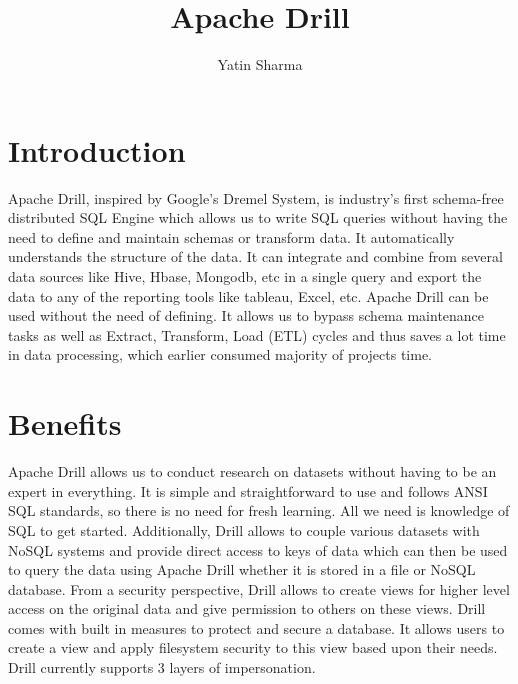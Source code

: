 \documentclass[9pt,twocolumn,twoside]{../../styles/osajnl}
\title{Apache Drill}
\author[1,*, +]{Yatin Sharma}
\affil[1]{School of Informatics and Computing, Bloomington, IN 47408, U.S.A.}
\affil[*]{Corresponding authors: yatins@indiana.edu}
\affil[+]{HID - S17-IR-2034}
\begin{document}
\maketitle

\section{Introduction}
	Apache Drill\cite{Drill}, inspired by Google's Dremel System, is industry's
	first schema-free distributed SQL Engine which allows us to write SQL queries
	without having the need to define and maintain schemas or transform data. It
	automatically understands the structure of the data. It can integrate and
	combine from several data sources like Hive, Hbase, Mongodb, etc in a single
	query and export the data to any of the reporting tools like
	tableau\cite{Tableau}, Excel, etc. Apache Drill can be used without the need of
	defining. It allows us to bypass schema maintenance tasks as well as Extract,
	Transform, Load (ETL) cycles and thus saves a lot time in data processing, which
	earlier consumed majority of projects time.

\section{Benefits}
	Apache Drill allows us to conduct research on datasets without having to be an
	expert in everything. It is simple and straightforward to use and follows ANSI
	SQL standards, so there is no need for fresh learning. All we need is knowledge
	of SQL to get started. Additionally, Drill allows to couple various datasets
	with NoSQL\cite{NoSQL} systems and provide direct access to keys of data which
	can then be used to query the data using Apache Drill whether it is stored in a
	file or NoSQL database.
	From a security perspective, Drill allows to create views for higher level
	access on the original data and give permission to others on these views. Drill
	comes with built in measures to protect and secure a database. It allows users
	to create a view and apply filesystem security to this view based upon their
	needs. Drill currently supports 3 layers of impersonation.
\end{document}
